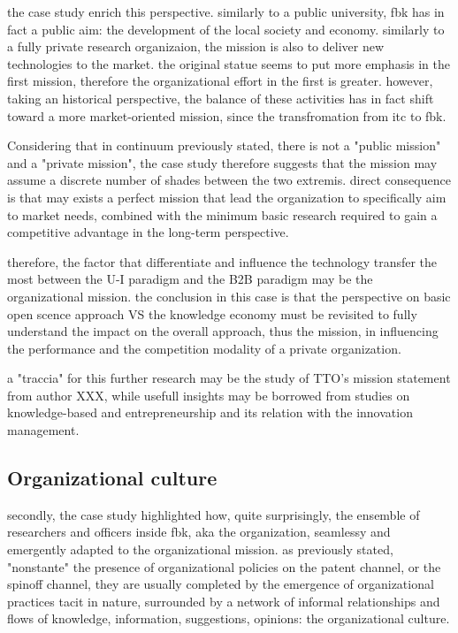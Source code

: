 the case study enrich this perspective. similarly to a public university, fbk has in fact a public aim: the development of the local society and economy. similarly to a fully private research organizaion, the mission is also to deliver new technologies to the market. the original statue seems to put more emphasis in the first mission, therefore the organizational effort in the first is greater. however, taking an historical perspective, the balance of these activities has in fact shift toward a more market-oriented mission, since the transfromation from itc to fbk. 

Considering that in continuum previously stated, there is not a "public mission" and a "private mission", the case study therefore suggests that the mission may assume a discrete number of shades between the two extremis. direct consequence is that may exists a perfect mission that lead the organization to specifically aim to market needs, combined with the minimum basic research required to gain a competitive advantage in the long-term perspective. 

therefore, the factor that differentiate and influence the technology transfer the most between the U-I paradigm and the B2B paradigm may be the organizational mission. the conclusion in this case is that the perspective on basic open scence approach VS the knowledge economy must be revisited to fully understand the impact on the overall approach, thus the mission, in influencing the performance and the competition modality of a private organization. 

a "traccia" for this further research may be the study of TTO's mission statement from author XXX, while usefull insights may be borrowed from studies on knowledge-based and entrepreneurship and its relation with the innovation management.

\subsection{Organizational culture}

secondly, the case study highlighted how, quite surprisingly, the ensemble of researchers and officers inside fbk, aka the organization, seamlessy and emergently adapted to the organizational mission. as previously stated, "nonstante" the presence of organizational policies on the patent channel, or the spinoff channel, they are usually completed by the emergence of organizational practices tacit in nature, surrounded by a network of informal relationships and flows of knowledge, information, suggestions, opinions: the organizational culture.

